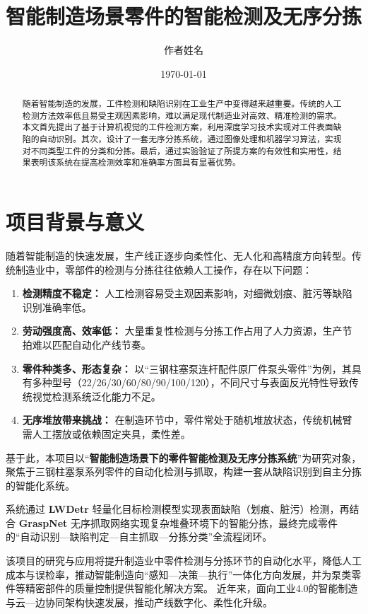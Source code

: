 \documentclass{cumcmthesis}
\title{智能制造场景零件的智能检测及无序分拣}
\author{作者姓名}
\date{\today}
\begin{document}
\newpage
\begin{abstract}
随着智能制造的发展，工件检测和缺陷识别在工业生产中变得越来越重要。传统的人工检测方法效率低且易受主观因素影响，难以满足现代制造业对高效、精准检测的需求。
本文首先提出了基于计算机视觉的工件检测方案，利用深度学习技术实现对工件表面缺陷的自动识别。其次，设计了一套无序分拣系统，通过图像处理和机器学习算法，实现对不同类型工件的分类和分拣。最后，通过实验验证了所提方案的有效性和实用性，结果表明该系统在提高检测效率和准确率方面具有显著优势。
\end{abstract}

\section{项目背景与意义}

随着智能制造的快速发展，生产线正逐步向柔性化、无人化和高精度方向转型。传统制造业中，零部件的检测与分拣往往依赖人工操作，存在以下问题：

\begin{enumerate}
    \item \textbf{检测精度不稳定：} 人工检测容易受主观因素影响，对细微划痕、脏污等缺陷识别准确率低。
    \item \textbf{劳动强度高、效率低：} 大量重复性检测与分拣工作占用了人力资源，生产节拍难以匹配自动化产线节奏。
    \item \textbf{零件种类多、形态复杂：} 以“三钢柱塞泵连杆配件原厂件泵头零件”为例，其具有多种型号（22/26/30/60/80/90/100/120），不同尺寸与表面反光特性导致传统视觉检测系统泛化能力不足。
    \item \textbf{无序堆放带来挑战：} 在制造环节中，零件常处于随机堆放状态，传统机械臂需人工摆放或依赖固定夹具，柔性差。
\end{enumerate}

基于此，本项目以“\textbf{智能制造场景下的零件智能检测及无序分拣系统}”为研究对象，聚焦于三钢柱塞泵系列零件的自动化检测与抓取，构建一套从缺陷识别到自主分拣的智能化系统。

系统通过 \textbf{LWDetr} \cite{carion2020detr,zhu2021deformable} 轻量化目标检测模型实现表面缺陷（划痕、脏污）检测，再结合 \textbf{GraspNet} \cite{tenPas2017gpd,mahler2017dexnet}无序抓取网络实现复杂堆叠环境下的智能分拣，最终完成零件的“自动识别—缺陷判定—自主抓取—分拣分类”全流程闭环。

该项目的研究与应用将提升制造业中零件检测与分拣环节的自动化水平，降低人工成本与误检率，推动智能制造向“感知—决策—执行”一体化方向发展，并为泵类零件等精密部件的质量控制提供智能化解决方案。
近年来，面向工业4.0的智能制造与云—边协同架构快速发展，推动产线数字化、柔性化升级\cite{lasi2014industry4,shi2016edge,kusiak2018smart}。
\end{document}
